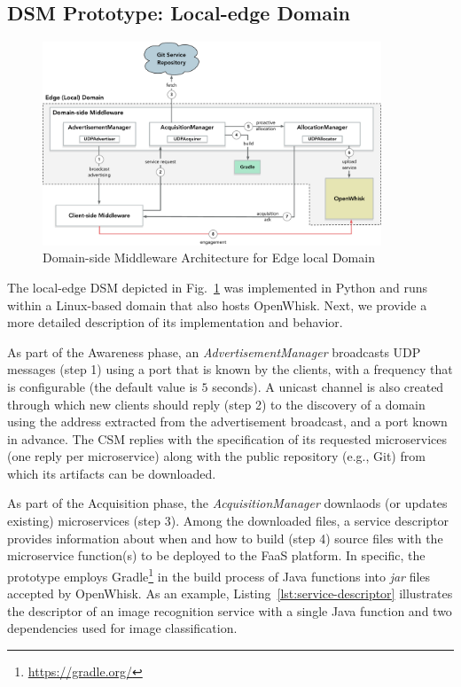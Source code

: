 \subsection{DSM Prototype: Local-edge Domain}

\begin{figure}[tbp]
	\includegraphics[width=0.9\textwidth]{figs/a3e-domain-prototype}
	\caption{Domain-side Middleware Architecture for Edge local Domain}
	\label{fig:local-edge-domain-prototype}
\end{figure}

The local-edge DSM depicted in Fig.~\ref{fig:local-edge-domain-prototype} was implemented in Python and runs within a Linux-based domain that also hosts OpenWhisk. Next, we provide a more detailed description of its implementation and behavior.

As part of the Awareness phase, an \textit{AdvertisementManager} broadcasts UDP messages (step 1) using a port that is known by the clients, with a frequency that is configurable (the default value is $5$ seconds). A unicast channel is also created through which new clients should reply (step 2) to the discovery of a domain using the address extracted from the advertisement broadcast, and a port known in advance. The CSM replies with the specification of its requested microservices (one reply per microservice) along with the public repository (e.g., Git) from which its artifacts can be downloaded.

As part of the Acquisition phase, the \textit{AcquisitionManager} downlaods (or updates existing) microservices (step 3). Among the downloaded files, a service descriptor provides information about when and how to build (step 4) source files with the microservice function(s) to be deployed to the FaaS platform. In specific, the prototype employs Gradle\footnote{\url{https://gradle.org/}} in the build process of Java functions into \textit{jar} files accepted by OpenWhisk. As an example, Listing~\ref{lst:service-descriptor} illustrates the descriptor of an image recognition service with a single Java function and two dependencies used for image classification.

